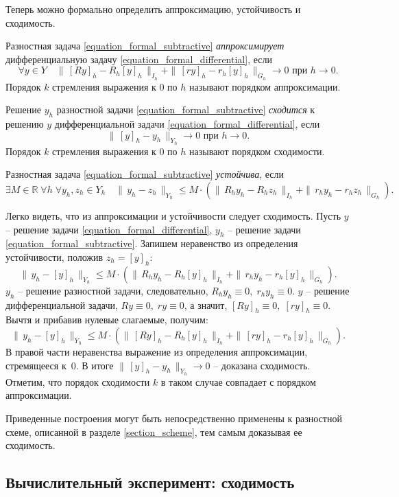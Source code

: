 \documentclass[a4paper,12pt]{article}
\theoremstyle{plain}
\theoremstyle{definition}
\begin{document}
Теперь можно формально определить аппроксимацию, устойчивость и сходимость.

Разностная задача \eqref{equation_formal_subtractive} \emph{аппроксимирует} дифференциальную задачу \eqref{equation_formal_differential}, если
$$\forall y \in Y \quad \| \, [Ry]_h - R_h [y]_h \, \|_{I_h} + \| \, [ry]_h - r_h [y]_h \, \|_{G_h} \to 0 \text{ при } h \to 0 \text{.}$$
Порядок $k$ стремления выражения к $0$ по $h$ называют порядком аппроксимации.

Решение $y_h$ разностной задачи \eqref{equation_formal_subtractive} \emph{сходится} к решению $y$ дифференциальной задачи \eqref{equation_formal_differential}, если
$$\| \, [y]_h - y_h \, \|_{Y_h} \to 0 \text{ при } h \to 0 \text{.}$$
Порядок $k$ стремления выражения к $0$ по $h$ называют порядком сходимости.

Разностная задача \eqref{equation_formal_subtractive} \emph{устойчива}, если
$$\exists M \in \mathbb{R} \; \forall h \; \forall y_h, z_h \in Y_h \quad \| \, y_h - z_h \, \|_{Y_h} \leqslant M \cdot (\| \, R_h y_h - R_h z_h \, \|_{I_h} + \| \, r_h y_h - r_h z_h \, \|_{G_h}) \text{.}$$

Легко видеть, что из аппроксимации и устойчивости следует сходимость. Пусть $y$ -- решение задачи \eqref{equation_formal_differential}, $y_h$ -- решение задачи \eqref{equation_formal_subtractive}. Запишем неравенство из определения устойчивости, положив $z_h = [y]_h$:
$$\| \, y_h - [y]_h \, \|_{Y_h} \leqslant M \cdot (\| \, R_h y_h - R_h [y]_h \, \|_{I_h} + \| \, r_h y_h - r_h [y]_h \, \|_{G_h}) \text{.}$$
$y_h$ -- решение разностной задачи, следовательно, $R_h y_h \equiv 0, \; r_h y_h \equiv 0$. $y$ -- решение дифференциальной задачи, $Ry \equiv 0, \; ry \equiv 0$, а значит, $[Ry]_h \equiv 0, \; [ry]_h \equiv 0$. Вычтя и прибавив нулевые слагаемые, получим:
$$\| \, y_h - [y]_h \, \|_{Y_h} \leqslant M \cdot (\| \, [Ry]_h - R_h [y]_h \, \|_{I_h} + \| \, [ry]_h - r_h [y]_h \, \|_{G_h}) \text{.}$$
В правой части неравенства выражение из определения аппроксимации, стремящееся к~$0$. В итоге $\| \, [y]_h - y_h \, \|_{Y_h} \to 0$ -- доказана сходимость. Отметим, что порядок сходимости $k$ в таком случае совпадает с порядком аппроксимации.

Приведенные построения могут быть непосредственно применены к разностной схеме, описанной в разделе \ref{section_scheme}, тем самым доказывая ее сходимость.


\subsection{Вычислительный эксперимент: сходимость}
\end{document}
